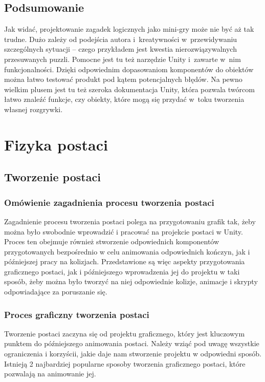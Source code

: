 \documentclass[oneside,polski,logo]{amuthesis}
\begin{document}
\section{Podsumowanie}
\par Jak widać, projektowanie zagadek logicznych jako mini-gry może nie być aż tak trudne. Dużo zależy od podejścia autora i~kreatywności w~przewidywaniu szczególnych sytuacji – czego przykładem jest kwestia nierozwiązywalnych przesuwanych puzzli. Pomocne jest tu też narzędzie Unity i~zawarte w~nim funkcjonalności. Dzięki odpowiednim dopasowaniom komponentów do obiektów można łatwo testować produkt pod kątem potencjalnych błędów. Na pewno wielkim plusem jest tu też szeroka dokumentacja Unity, która pozwala twórcom łatwo znaleźć funkcje, czy obiekty, które mogą się przydać w~toku tworzenia własnej rozgrywki.

\chapter{Fizyka postaci}
\section{Tworzenie postaci}
\subsection{Omówienie zagadnienia procesu tworzenia postaci}
Zagadnienie procesu tworzenia postaci polega na przygotowaniu grafik tak, żeby można było swobodnie wprowadzić i pracować na projekcie postaci w Unity. Proces ten obejmuje również stworzenie odpowiednich komponentów przygotowanych bezpośrednio w celu animowania odpowiednich kończyn, jak i późniejszej pracy na kolizjach. Przedstawione są więc aspekty przygotowania graficznego postaci, jak i późniejszego wprowadzenia jej do projektu w taki sposób, żeby można było tworzyć na niej odpowiednie kolizje, animacje i skrypty odpowiadające za poruszanie się.
\subsection{Proces graficzny tworzenia postaci}
Tworzenie postaci zaczyna się od projektu graficznego, który jest kluczowym punktem do późniejszego animowania postaci. Należy wziąć pod uwagę wszystkie ograniczenia i korzyścii, jakie daje nam stworzenie projektu w odpowiedni sposób. Istnieją 2 najbardziej popularne sposoby tworzenia graficznego postaci, które pozwalają na animowanie jej.
\end{document}
